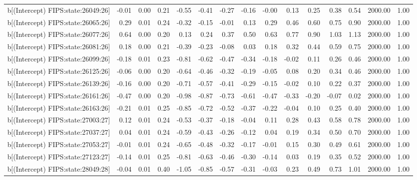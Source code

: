 \begin{table}[ht]
\begin{tabular}{rrrrrrrrrrrrrrr}
  b[(Intercept) FIPS:state:26049:26] & -0.01 & 0.00 & 0.21 & -0.55 & -0.41 & -0.27 & -0.16 & -0.00 & 0.13 & 0.25 & 0.38 & 0.54 & 2000.00 & 1.00 \\ 
  b[(Intercept) FIPS:state:26065:26] & 0.29 & 0.01 & 0.24 & -0.32 & -0.15 & -0.01 & 0.13 & 0.29 & 0.46 & 0.60 & 0.75 & 0.90 & 2000.00 & 1.00 \\ 
  b[(Intercept) FIPS:state:26077:26] & 0.64 & 0.00 & 0.20 & 0.13 & 0.24 & 0.37 & 0.50 & 0.63 & 0.77 & 0.90 & 1.03 & 1.13 & 2000.00 & 1.00 \\ 
  b[(Intercept) FIPS:state:26081:26] & 0.18 & 0.00 & 0.21 & -0.39 & -0.23 & -0.08 & 0.03 & 0.18 & 0.32 & 0.44 & 0.59 & 0.75 & 2000.00 & 1.00 \\ 
  b[(Intercept) FIPS:state:26099:26] & -0.18 & 0.01 & 0.23 & -0.81 & -0.62 & -0.47 & -0.34 & -0.18 & -0.02 & 0.11 & 0.26 & 0.46 & 2000.00 & 1.00 \\ 
  b[(Intercept) FIPS:state:26125:26] & -0.06 & 0.00 & 0.20 & -0.64 & -0.46 & -0.32 & -0.19 & -0.05 & 0.08 & 0.20 & 0.34 & 0.46 & 2000.00 & 1.00 \\ 
  b[(Intercept) FIPS:state:26139:26] & -0.16 & 0.00 & 0.20 & -0.71 & -0.57 & -0.41 & -0.29 & -0.15 & -0.02 & 0.10 & 0.22 & 0.37 & 2000.00 & 1.00 \\ 
  b[(Intercept) FIPS:state:26161:26] & -0.47 & 0.00 & 0.20 & -0.98 & -0.87 & -0.73 & -0.61 & -0.47 & -0.33 & -0.20 & -0.07 & 0.02 & 2000.00 & 1.00 \\ 
  b[(Intercept) FIPS:state:26163:26] & -0.21 & 0.01 & 0.25 & -0.85 & -0.72 & -0.52 & -0.37 & -0.22 & -0.04 & 0.10 & 0.25 & 0.40 & 2000.00 & 1.00 \\ 
  b[(Intercept) FIPS:state:27003:27] & 0.12 & 0.01 & 0.24 & -0.53 & -0.37 & -0.18 & -0.04 & 0.11 & 0.28 & 0.43 & 0.58 & 0.78 & 2000.00 & 1.00 \\ 
  b[(Intercept) FIPS:state:27037:27] & 0.04 & 0.01 & 0.24 & -0.59 & -0.43 & -0.26 & -0.12 & 0.04 & 0.19 & 0.34 & 0.50 & 0.70 & 2000.00 & 1.00 \\ 
  b[(Intercept) FIPS:state:27053:27] & -0.01 & 0.01 & 0.24 & -0.65 & -0.48 & -0.32 & -0.17 & -0.01 & 0.15 & 0.30 & 0.49 & 0.61 & 2000.00 & 1.00 \\ 
  b[(Intercept) FIPS:state:27123:27] & -0.14 & 0.01 & 0.25 & -0.81 & -0.63 & -0.46 & -0.30 & -0.14 & 0.03 & 0.19 & 0.35 & 0.52 & 2000.00 & 1.00 \\ 
  b[(Intercept) FIPS:state:28049:28] & -0.04 & 0.01 & 0.40 & -1.05 & -0.85 & -0.57 & -0.31 & -0.03 & 0.23 & 0.49 & 0.73 & 1.01 & 2000.00 & 1.00 \\ 

\end{tabular}
\end{table}
